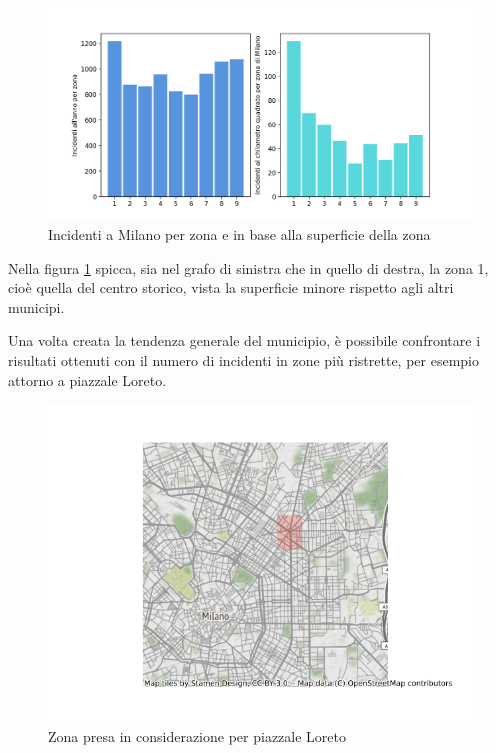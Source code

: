 \documentclass[a4paper]{report}
\begin{document}
\begin{figure}
    \includegraphics[width=\linewidth]{../src/municipi_milano/incidenti_superf.png}
    \caption{Incidenti a Milano per zona e in base alla superficie della zona}
    \label{fig:incidenti-chilometro}
\end{figure}

Nella figura \ref{fig:incidenti-chilometro} spicca, sia nel grafo di sinistra che in quello di destra, 
la zona 1, cioè quella del centro storico, vista la superficie minore rispetto agli altri municipi.

Una volta creata la tendenza generale del municipio, è possibile confrontare i risultati 
ottenuti con il numero di incidenti in zone più ristrette, per esempio attorno a piazzale Loreto.

\begin{figure}
    \includegraphics[width=\linewidth]{../src/municipi_milano/zona_loreto.png}
    \caption{Zona presa in considerazione per piazzale Loreto}
    \label{fig:zona-loreto}
\end{figure}
\end{document}
